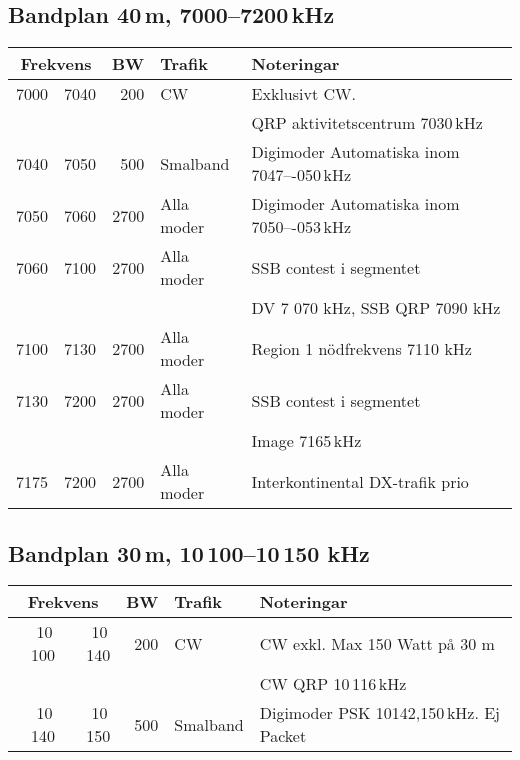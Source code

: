 \subsection{Bandplan 40\,m, 7000--7200\,kHz}
\begin{tabular}{rrrll}
\multicolumn{2}{c}{\textbf{Frekvens}} & \textbf{BW} & \textbf{Trafik} & \textbf{Noteringar} \\ \hline
7000 & 7040 & 200  & CW         & Exklusivt CW.                             \\
     &      &      &            & QRP aktivitetscentrum 7030\,kHz           \\ \hline
7040 & 7050 & 500  & Smalband   & Digimoder Automatiska inom 7047–-050\,kHz \\ \hline
7050 & 7060 & 2700 & Alla moder & Digimoder Automatiska inom 7050–-053\,kHz \\ \hline
7060 & 7100 & 2700 & Alla moder & SSB contest i segmentet                   \\
     &      &      &            & DV 7 070 kHz, SSB QRP 7090 kHz            \\ \hline
7100 & 7130 & 2700 & Alla moder & Region 1 nödfrekvens 7110 kHz             \\ \hline
7130 & 7200 & 2700 & Alla moder & SSB contest i segmentet                   \\
     &      &      &            & Image 7165\,kHz                           \\ \hline
7175 & 7200 & 2700 & Alla moder & Interkontinental DX-trafik prio           \\ \hline
\end{tabular}

\subsection{Bandplan 30\,m, 10\,100--10\,150 kHz}
\begin{tabular}{rrrll}
\multicolumn{2}{c}{\textbf{Frekvens}} & \textbf{BW} & \textbf{Trafik} & \textbf{Noteringar} \\ \hline
10\,100 & 10\,140 & 200 & CW       & CW exkl. Max 150 Watt på 30 m           \\
        &         &     &          & CW QRP 10\,116\,kHz                     \\ \hline
10\,140 & 10\,150 & 500 & Smalband & Digimoder PSK 10142,150\,kHz. Ej Packet \\ \hline
\end{tabular}

